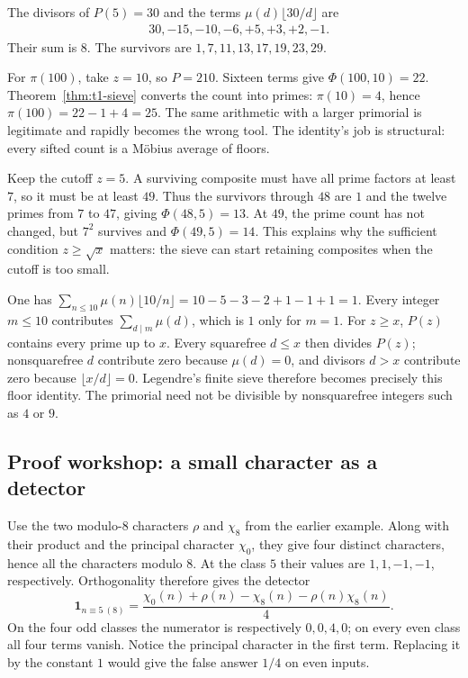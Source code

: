 \begin{examplex}
The divisors of $P(5)=30$ and the terms $\mu(d)\lfloor30/d\rfloor$ are
\[
\begin{aligned}
&30,-15,-10,-6,+5,+3,+2,-1.
\end{aligned}
\]
Their sum is $8$. The survivors are $1,7,11,13,17,19,23,29$.

For $\pi(100)$, take $z=10$, so $P=210$. Sixteen terms give $\Phi(100,10)=22$. Theorem~\ref{thm:t1-sieve} converts the count into primes: $\pi(10)=4$, hence $\pi(100)=22-1+4=25$. The same arithmetic with a larger primorial is legitimate and rapidly becomes the wrong tool. The identity's job is structural: every sifted count is a M\"obius average of floors.
\end{examplex}

\begin{examplex}
Keep the cutoff $z=5$. A surviving composite must have all prime factors at least $7$, so it must be at least $49$. Thus the survivors through $48$ are $1$ and the twelve primes from $7$ to $47$, giving $\Phi(48,5)=13$. At $49$, the prime count has not changed, but $7^2$ survives and $\Phi(49,5)=14$. This explains why the sufficient condition $z\ge\sqrt x$ matters: the sieve can start retaining composites when the cutoff is too small.
\end{examplex}

\begin{examplex}[the floor identity at $x=10$]
One has $\sum_{n\le 10}\mu(n)\lfloor 10/n\rfloor=10-5-3-2+1-1+1=1$. Every integer $m\le 10$ contributes $\sum_{d\mid m}\mu(d)$, which is $1$ only for $m=1$. For $z\ge x$, $P(z)$ contains every prime up to $x$. Every squarefree $d\le x$ then divides $P(z)$; nonsquarefree $d$ contribute zero because $\mu(d)=0$, and divisors $d>x$ contribute zero because $\lfloor x/d\rfloor=0$. Legendre's finite sieve therefore becomes precisely this floor identity. The primorial need not be divisible by nonsquarefree integers such as $4$ or $9$.
\end{examplex}

\subsection*{Proof workshop: a small character as a detector}

Use the two modulo-$8$ characters $\rho$ and $\chi_8$ from the earlier example. Along with their product and the principal character $\chi_0$, they give four distinct characters, hence all the characters modulo $8$. At the class $5$ their values are $1,1,-1,-1$, respectively. Orthogonality therefore gives the detector
\[
\mathbf 1_{n\equiv5\ (8)}
=\frac{\chi_0(n)+\rho(n)-\chi_8(n)-\rho(n)\chi_8(n)}4.
\]
On the four odd classes the numerator is respectively $0,0,4,0$; on every even class all four terms vanish. Notice the principal character in the first term. Replacing it by the constant $1$ would give the false answer $1/4$ on even inputs.

